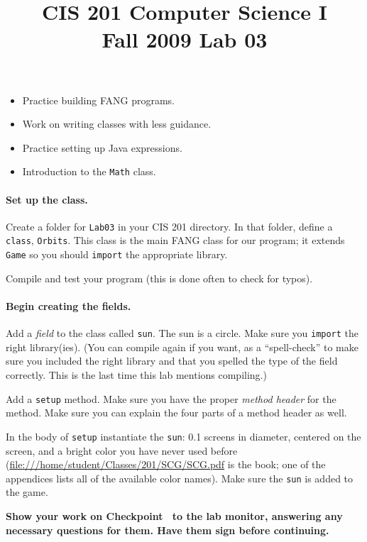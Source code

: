 \documentclass[12pt,twoside]{memoir}
\title{CIS 201 Computer Science I\\Fall 2009 Lab #1}%
\newenvironment{Checkpoint}[1]{%
\begin{Exercise}[name={Checkpoint},title={#1}]}{%
\end{Exercise}%
\textbf{Show your work on Checkpoint~\theExercise{} to the lab monitor, %
  answering any necessary questions for them.  Have them sign before continuing.}}
\newcommand{\lab}[1]{%
\title{CIS 201 Computer Science I\\Fall 2009 Lab #1}%
\maketitle%
}
\begin{document}
\lab{03}

\begin{itemize}
\item Practice building FANG programs.
\item Work on writing classes with less guidance.
\item Practice setting up Java expressions.
\item Introduction to the \texttt{Math} class.
\end{itemize}

\begin{Checkpoint}{Let there be light!}
\paragraph{Set up the class.}
Create a folder for \texttt{Lab03} in your CIS 201 directory. In that
folder, define a \texttt{class}, \texttt{Orbits}. This class is the
main FANG class for our program; it extends \texttt{Game} so you
should \texttt{import} the appropriate library.

Compile and test your program (this is done often to check for
typos). 

\paragraph{Begin creating the fields.}
Add a \emph{field} to the class called \texttt{sun}. The sun is a
circle. Make sure you \texttt{import} the right library(ies). (You can
compile again if you want, as a ``spell-check'' to make sure you
included the right library and that you spelled the type of the field
correctly. This is the last time this lab mentions compiling.)

Add a \texttt{setup} method. Make sure you have the proper
\emph{method header} for the method. Make sure you can explain the
four parts of a method header as well.

In the body of \texttt{setup} instantiate the \texttt{sun}: 0.1
screens in diameter, centered on the screen, and a bright color you
have never used before
(\url{file:///home/student/Classes/201/SCG/SCG.pdf} is the book; one
of the appendices lists all of the available color names). Make sure
the \texttt{sun} is added to the game.
\end{Checkpoint}
\end{document}
